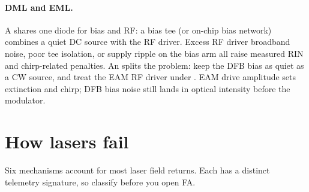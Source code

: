 \paragraph{DML and EML.}
A  shares one diode for bias and RF: a bias tee (or on-chip bias network)
combines a quiet DC source with the RF driver. Excess RF driver broadband noise,
poor tee isolation, or supply ripple on the bias arm all raise measured RIN and
chirp-related penalties. An  splits the problem: keep the DFB bias as
quiet as a CW source, and treat the EAM RF driver under . EAM
drive amplitude sets extinction and chirp; DFB bias noise still lands in optical
intensity before the modulator.


\section{How lasers fail}
\label{sec:how-lasers-fail}

Six mechanisms account for most laser field returns. Each has a distinct
telemetry signature, so classify before you open FA.

